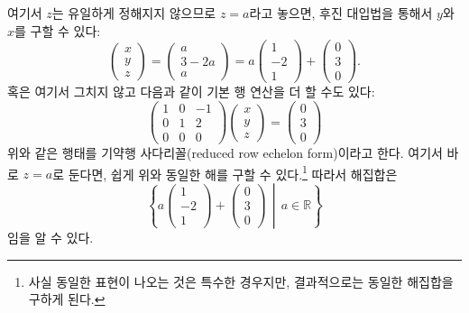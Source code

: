 \documentclass[unfonts,oneside,a4paper]{oblivoir}
\theoremstyle{definition}
\theoremstyle{theorem}
\theoremstyle{remark}
\theoremstyle{remark}
\theoremstyle{remark}
\theoremstyle{remark}
\begin{document}
   여기서 $z$는 유일하게 정해지지 않으므로 $z = a$라고 놓으면, 후진 대입법을 통해서 $y$와 $x$를 구할 수 있다:
   \begin{equation*}
       \begin{pmatrix}
           x\\
           y\\
           z
       \end{pmatrix}
       =
       \begin{pmatrix}
           a\\
           3 - 2a\\
           a
       \end{pmatrix}
       =
       a
       \begin{pmatrix}
           1\\
           -2\\
           1
       \end{pmatrix}
       +
       \begin{pmatrix}
           0\\
           3\\
           0
       \end{pmatrix}.
   \end{equation*}
혹은 여기서 그치지 않고 다음과 같이 기본 행 연산을 더 할 수도 있다:
\begin{equation*}
    \begin{pmatrix}
        1 & 0 & -1\\
        0 & 1 & 2\\
        0 & 0 & 0
    \end{pmatrix}
    \begin{pmatrix}
        x\\
        y\\
        z
    \end{pmatrix}
    =
    \begin{pmatrix}
        0\\
        3\\
        0
    \end{pmatrix}
\end{equation*}
위와 같은 행태를 기약행 사다리꼴(reduced row echelon form)이라고 한다.
여기서 바로 $z = a$로 둔다면, 쉽게 위와 동일한 해를 구할 수 있다.\footnote{사실 동일한 표현이 나오는 것은 특수한 경우지만, 결과적으로는 동일한 해집합을 구하게 된다.}
따라서 해집합은
\begin{equation*}
    \left\{ a
    \begin{pmatrix}
        1\\
        -2\\
        1
    \end{pmatrix}
    +
    \begin{pmatrix}
        0\\
        3\\
        0
    \end{pmatrix}
    \,\middle|\, a \in \mathbb R
    \right\}
\end{equation*}
임을 알 수 있다.
\end{document}
